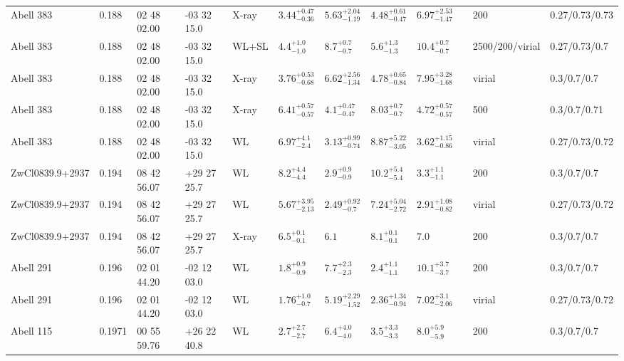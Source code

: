 \begin{landscape}
\begin{center}
{\begin{longtable}{llllllllllll}
Abell 383 & 0.188 & 02 48 02.00 & -03 32 15.0 & X-ray & ${3.44}^{+0.47}_{-0.36}$ & ${5.63}^{+2.04}_{-1.19}$ & ${4.48}^{+0.61}_{-0.47}$ & ${6.97}^{+2.53}_{-1.47}$ & \citet{BA14.1} & 200 & 0.27/0.73/0.73 \\
Abell 383 & 0.188 & 02 48 02.00 & -03 32 15.0 & WL+SL & ${4.4}^{+1.0}_{-1.0}$ & ${8.7}^{+0.7}_{-0.7}$ & ${5.6}^{+1.3}_{-1.3}$ & ${10.4}^{+0.7}_{-0.7}$ & \citet{ME14.1} & 2500/200/virial & 0.27/0.73/0.7 \\
Abell 383 & 0.188 & 02 48 02.00 & -03 32 15.0 & X-ray & ${3.76}^{+0.53}_{-0.68}$ & ${6.62}^{+2.56}_{-1.34}$ & ${4.78}^{+0.65}_{-0.84}$ & ${7.95}^{+3.28}_{-1.68}$ & \citet{SC07.1} & virial & 0.3/0.7/0.7 \\
Abell 383 & 0.188 & 02 48 02.00 & -03 32 15.0 & X-ray & ${6.41}^{+0.57}_{-0.57}$ & ${4.1}^{+0.47}_{-0.47}$ & ${8.03}^{+0.7}_{-0.7}$ & ${4.72}^{+0.57}_{-0.57}$ & \citet{VI06.1} & 500 & 0.3/0.7/0.71 \\
Abell 383 & 0.188 & 02 48 02.00 & -03 32 15.0 & WL & ${6.97}^{+4.1}_{-2.4}$ & ${3.13}^{+0.99}_{-0.74}$ & ${8.87}^{+5.22}_{-3.05}$ & ${3.62}^{+1.15}_{-0.86}$ & \citet{OK10.1} & virial & 0.27/0.73/0.72 \\
ZwCl0839.9+2937 & 0.194 & 08 42 56.07 & +29 27 25.7 & WL & ${8.2}^{+4.4}_{-4.4}$ & ${2.9}^{+0.9}_{-0.9}$ & ${10.2}^{+5.4}_{-5.4}$ & ${3.3}^{+1.1}_{-1.1}$ & \citet{SE14.1} & 200 & 0.3/0.7/0.7 \\
ZwCl0839.9+2937 & 0.194 & 08 42 56.07 & +29 27 25.7 & WL & ${5.67}^{+3.95}_{-2.13}$ & ${2.49}^{+0.92}_{-0.7}$ & ${7.24}^{+5.04}_{-2.72}$ & ${2.91}^{+1.08}_{-0.82}$ & \citet{OK10.1} & virial & 0.27/0.73/0.72 \\
ZwCl0839.9+2937 & 0.194 & 08 42 56.07 & +29 27 25.7 & X-ray & ${6.5}^{+0.1}_{-0.1}$ & ${6.1}^{}_{}$ & ${8.1}^{+0.1}_{-0.1}$ & ${7.0}^{}_{}$ & \citet{WA05.1} & 200 & 0.3/0.7/0.7 \\
Abell 291 & 0.196 & 02 01 44.20 & -02 12 03.0 & WL & ${1.8}^{+0.9}_{-0.9}$ & ${7.7}^{+2.3}_{-2.3}$ & ${2.4}^{+1.1}_{-1.1}$ & ${10.1}^{+3.7}_{-3.7}$ & \citet{SE14.1} & 200 & 0.3/0.7/0.7 \\
Abell 291 & 0.196 & 02 01 44.20 & -02 12 03.0 & WL & ${1.76}^{+1.0}_{-0.7}$ & ${5.19}^{+2.29}_{-1.52}$ & ${2.36}^{+1.34}_{-0.94}$ & ${7.02}^{+3.1}_{-2.06}$ & \citet{OK10.1} & virial & 0.27/0.73/0.72 \\
Abell 115 & 0.1971 & 00 55 59.76 & +26 22 40.8 & WL & ${2.7}^{+2.7}_{-2.7}$ & ${6.4}^{+4.0}_{-4.0}$ & ${3.5}^{+3.3}_{-3.3}$ & ${8.0}^{+5.9}_{-5.9}$ & \citet{SE14.1} & 200 & 0.3/0.7/0.7 \\

\end{longtable}}
\end{center}
\end{landscape}
